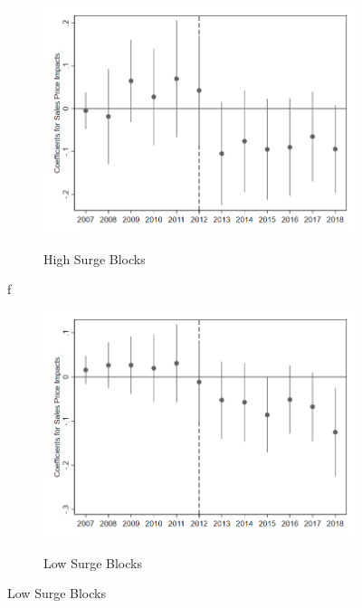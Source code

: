 \documentclass[12pt]{article}
\begin{document}
{{{{{{\begin{figure}[h!]
\begin{center}
\caption{Impacts on Sales Prices}
\begin{subfigure}[b]{0.4\textwidth}
\caption{High Surge Blocks}
\includegraphics[scale = 0.35]{Robustness/Graph3c_high surge.png}
\label{fig:highsales}
\end{subfigure}f
\hfill
\begin{subfigure}[b]{0.4\textwidth}
\caption{Low Surge Blocks}
\includegraphics[scale = 0.35]{Robustness/Graph4c_low surge.png}
\label{fig:lowsales}
\end{subfigure}
\end{center}
\end{figure}

}}}}}}
\end{document}
